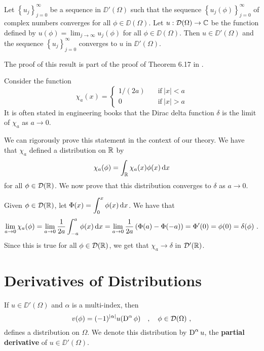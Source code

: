 \begin{prop}
Let $\displaystyle \left\{ u_j \right\}_{j=0}^\infty$ be a sequence
in $\DD'(\Omega)$ such that the sequence
$\displaystyle \left\{ u_j(\phi) \right\}_{j=0}^\infty$ of complex numbers
converges for all $\phi \in \DD(\Omega)$.  Let
$u : \mathcal{D}(\Omega) \to \mathbb{C}$ be the function defined
by $\displaystyle u(\phi) = \lim_{j\to \infty} u_j(\phi)$ for all
$\phi \in \DD(\Omega)$.  Then $u\in \DD'(\Omega)$ and the sequence 
$\displaystyle \left\{ u_j \right\}_{j=0}^\infty$ converges to $u$ in
$\DD'(\Omega)$.
\end{prop}

The proof of this result is part of the proof of Theorem 6.17 in
\cite{RuFA}.

\begin{egg}
Consider the function        \label{chia_delta}
\[
\chi_a(x) =
\begin{cases}
1/(2a) & \quad \text{if} \ |x|<a \\
0 & \quad \text{if} \ |x| >a
\end{cases}
\]
It is often stated in engineering books that the Dirac delta function
$\delta$ is the limit of $\chi_a$ as $a \to 0$.

We can rigorously prove this statement in the context of our theory.
We have that $\chi_a$ defined a distribution on $\mathbb{R}$ by
\[
  \chi_a(\phi) = \int_{\mathbb{R}} \chi_a(x) \phi(x) \,\mathrm{d}{x}
\]
for all $\phi \in \mathcal{D}(\mathbb{R})$.  We now prove that this distribution
converges to $\delta$ as $ a \to 0$.

Given $\phi \in \mathcal{D}(\mathbb{R})$, let
$\displaystyle \Phi(x) = \int_0^x \phi(x) \,\mathrm{d}{x}$.
We have that
\[
\lim_{a\to 0} \chi_a(\phi)
= \lim_{a\to 0}\frac{1}{2a} \int_{-a}^a \phi(x) \,\mathrm{d}{x} 
= \lim_{a\to 0}\frac{1}{2a} \left( \Phi(a) - \Phi(-a)\right)
= \Phi'(0) = \phi(0) = \delta(\phi) \ .
\]
Since this is true for all $\phi \in \mathcal{D}(\mathbb{R})$, we get that
$\chi_a \to \delta$ in $\mathcal{D}'(\mathbb{R})$.
\end{egg}

\section{Derivatives of Distributions}

\begin{prop} \label{distr_der_def}
If $u \in \DD'(\Omega)$ and $\alpha$ is a multi-index, then
\[
v(\phi) = (-1)^{|\alpha|}u(\operatorname{D}^\alpha \phi) \quad ,
\quad \phi \in \mathcal{D}(\Omega) \ ,
\]
defines a distribution on $\Omega$.  We denote this distribution by
$\displaystyle \operatorname{D}^\alpha u$, the
{\bfseries partial derivative}
of $u\in \DD'(\Omega)$.
\end{prop}

